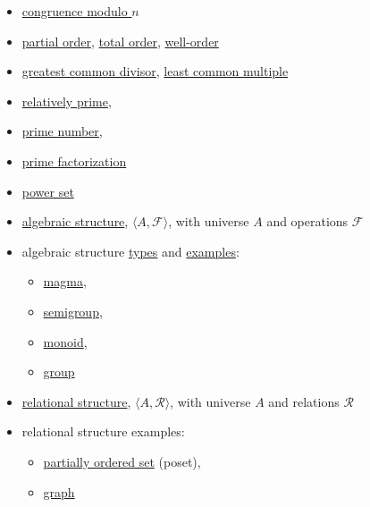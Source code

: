 \documentclass[12pt]{article}
\newcommand\<{\ensuremath{\langle}}
\renewcommand\>{\ensuremath{\rangle}}
\begin{document}
\begin{itemize}
\item \href{http://en.wikipedia.org/wiki/Congruence_relation}{congruence modulo $n$}
\item \href{http://en.wikipedia.org/wiki/Partially_ordered_set#Formal_definition}{partial order}, 
\href{http://en.wikipedia.org/wiki/Total_order}{total order},
\href{http://en.wikipedia.org/wiki/Well-order}{well-order}
\item \href{http://en.wikipedia.org/wiki/Greatest_common_divisor}{greatest common divisor}, 
\href{http://en.wikipedia.org/wiki/Least_common_multiple}{least common multiple}
\item \href{http://en.wikipedia.org/wiki/Coprime_integers}{relatively prime}, 
\item \href{http://en.wikipedia.org/wiki/Prime_number}{prime number},
\item \href{http://en.wikipedia.org/wiki/Fundamental_theorem_of_arithmetic}{prime factorization}
\item \href{http://en.wikipedia.org/wiki/Power_set}{power set}
\item \href{http://en.wikipedia.org/wiki/Algebraic_structure}{algebraic structure}, 
  $\<A, \mathcal{F}\>$, with universe $A$ and operations $\mathcal{F}$ 
\item algebraic structure \href{http://en.wikipedia.org/wiki/Outline_of_algebraic_structures#Types_of_algebraic_structures}{types} and 
\href{http://en.wikipedia.org/wiki/Outline_of_algebraic_structures}{examples}:
  \begin{itemize}
  \item \href{http://en.wikipedia.org/wiki/Magma_(algebra)}{magma}, 
  \item \href{http://en.wikipedia.org/wiki/Semigroup}{semigroup}, 
  \item \href{http://en.wikipedia.org/wiki/Monoid}{monoid}, 
  \item \href{http://en.wikipedia.org/wiki/Group_(mathematics)}{group} %
  \end{itemize}


\item \href{http://en.wikipedia.org/wiki/Structure_(mathematical_logic)}{relational structure}, 
  $\<A, \mathcal{R}\>$, with universe $A$ and relations $\mathcal{R}$ 
\item relational structure examples: 
  \begin{itemize}
  \item \href{http://en.wikipedia.org/wiki/Partially_ordered_set}{partially ordered set} (poset), 
    \item \href{http://en.wikipedia.org/wiki/Graph_(mathematics)}{graph}
  \end{itemize}


\end{itemize}
\end{document}
